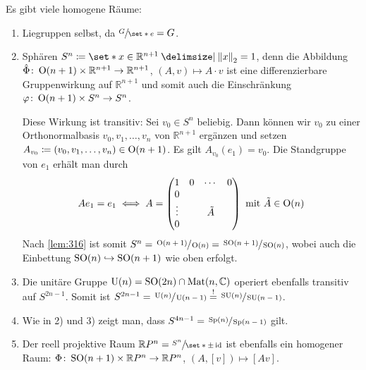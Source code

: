 \begin{beispiel*}[{name=[homogene Räume]},label=bsp:homSpaces]
	Es gibt viele homogene Räume:
	\begin{enumerate}[1)]
		\item Liegruppen selbst, da $\sfrac{G}{\set*{e}} =G$.
		\item Sphären $S^n \coloneqq \set*{x \in \mathbb{R}^{n+1} \given \norm*{x}_2=1}$, denn die Abbildung $\hat{\Phi} \colon \operatorname{O}(n+1) \times \mathbb{R}^{n+1} \to \mathbb{R}^{n+1}$, $(A,v) \mapsto A \cdot v$ ist eine differenzierbare Gruppenwirkung auf $\mathbb{R}^{n+1}$ und somit auch die Einschränkung $\varphi \colon \operatorname{O}(n+1) \times S^n \to S^n$.
		
		Diese Wirkung ist transitiv: Sei $v_0 \in S^n$ beliebig.
		Dann können wir $v_0$ zu einer Orthonormalbasis $v_0,v_1, \ldots ,v_n$ von $\mathbb{R}^{n+1}$ ergänzen und setzen $A_{v_0} \coloneqq (v_0,v_1, \ldots , v_n) \in \operatorname{O}(n+1)$.
		Es gilt $A_{v_0}(e_1) = v_0$.
		Die Standgruppe von $e_1$ erhält man durch
		\[
			A e_1 = e_1 \iff A = \begin{pmatrix}
				1 & 0 & \cdots & 0 \\
				0 & & & \\
				\vdots & & \tilde{A} & \\
				0 & & & 
			\end{pmatrix} \text{ mit } \tilde{A} \in \operatorname{O}(n)
		\]
		Nach \autoref{lem:316} ist somit $S^n = \sfrac{\operatorname{O}(n+1)}{\operatorname{O}(n)} = \sfrac{\operatorname{SO}(n+1)}{\operatorname{SO}(n)}$, wobei auch die Einbettung $\operatorname{SO}(n) \hookrightarrow \operatorname{SO}(n+1)$ wie oben erfolgt.
		\item Die unitäre Gruppe $\operatorname{U}(n) = \operatorname{SO}(2n) \cap \operatorname{Mat}(n,\mathbb{C})$ operiert ebenfalls transitiv auf $S^{2n-1}$.
		Somit ist $S^{2n-1} = \sfrac{\operatorname{U}(n)}{\operatorname{U}(n-1)} \stackrel{!}{=} \sfrac{\operatorname{SU}(n)}{\operatorname{SU}(n-1)}$.
		\item Wie in 2) und 3) zeigt man, dass
		\(
			S^{4n-1} = \sfrac{\operatorname{Sp}(n)}{\operatorname{Sp}(n-1)}
		\) gilt.
		\item Der reell projektive Raum $\mathbb{R}P^n = \sfrac{S^n}{\set*{\pm \id}}$ ist ebenfalls ein homogener Raum: $\Phi \colon \operatorname{SO}(n+1) \times \mathbb{R}P^n \to \mathbb{R}P^n$, $(A,[v]) \mapsto [Av]$.
		

\end{enumerate}
\end{beispiel*}
